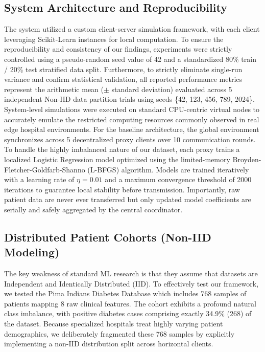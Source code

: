 \documentclass[conference]{IEEEtran}
\begin{document}
\subsection{System Architecture and Reproducibility}
The system utilized a custom client-server simulation framework, with each client leveraging Scikit-Learn instances for local computation. To ensure the reproducibility and consistency of our findings, experiments were strictly controlled using a pseudo-random seed value of 42 and a standardized 80\% train / 20\% test stratified data split. Furthermore, to strictly eliminate single-run variance and confirm statistical validation, all reported performance metrics represent the arithmetic mean (\( \pm \) standard deviation) evaluated across 5 independent Non-IID data partition trials using seeds \{42, 123, 456, 789, 2024\}. System-level simulations were executed on standard CPU-centric virtual nodes to accurately emulate the restricted computing resources commonly observed in real edge hospital environments. For the baseline architecture, the global environment synchronizes across 5 decentralized proxy clients over 10 communication rounds. To handle the highly imbalanced nature of our dataset, each proxy trains a localized Logistic Regression model optimized using the limited-memory Broyden-Fletcher-Goldfarb-Shanno (L-BFGS) algorithm. Models are trained iteratively with a learning rate of \( \eta = 0.01 \) and a maximum convergence threshold of 2000 iterations to guarantee local stability before transmission. Importantly, raw patient data are never ever transferred but only updated model coefficients are serially and safely aggregated by the central coordinator.

\subsection{Distributed Patient Cohorts (Non-IID Modeling)}
The key weakness of standard ML research is that they assume that datasets are Independent and Identically Distributed (IID). To effectively test our framework, we tested the Pima Indians Diabetes Database which includes 768 samples of patients mapping 8 raw clinical features. The cohort exhibits a profound natural class imbalance, with positive diabetes cases comprising exactly 34.9\% (268) of the dataset. Because specialized hospitals treat highly varying patient demographics, we deliberately fragmented these 768 samples by explicitly implementing a non-IID distribution split across horizontal clients.
\end{document}
